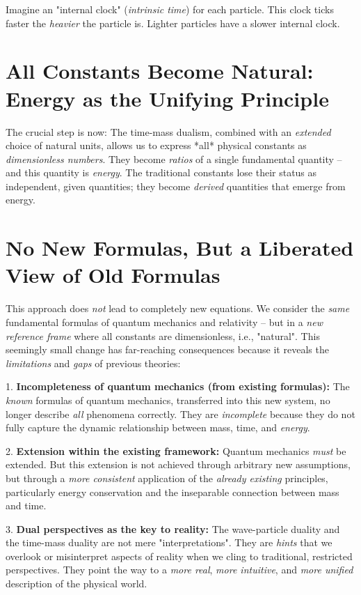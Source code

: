 \documentclass[a4paper,12pt]{article}
\begin{document}
	Imagine an "internal clock" (\emph{intrinsic time}) for each particle. This clock ticks faster the \emph{heavier} the particle is. Lighter particles have a slower internal clock.
	
	\section{All Constants Become Natural: Energy as the Unifying Principle}
	
	The crucial step is now: The time-mass dualism, combined with an \emph{extended} choice of natural units, allows us to express *all* physical constants as \emph{dimensionless numbers}. They become \emph{ratios} of a single fundamental quantity – and this quantity is \emph{energy}. The traditional constants lose their status as independent, given quantities; they become \emph{derived} quantities that emerge from energy.
	
	\section{No New Formulas, But a Liberated View of Old Formulas}
	
	This approach does \emph{not} lead to completely new equations. We consider the \emph{same} fundamental formulas of quantum mechanics and relativity – but in a \emph{new reference frame} where all constants are dimensionless, i.e., "natural". This seemingly small change has far-reaching consequences because it reveals the \emph{limitations} and \emph{gaps} of previous theories:
	
	1.  \textbf{Incompleteness of quantum mechanics (from existing formulas):} The \emph{known} formulas of quantum mechanics, transferred into this new system, no longer describe \emph{all} phenomena correctly. They are \emph{incomplete} because they do not fully capture the dynamic relationship between mass, time, and \emph{energy}.
	
	2.  \textbf{Extension within the existing framework:} Quantum mechanics \emph{must} be extended. But this extension is not achieved through arbitrary new assumptions, but through a \emph{more consistent} application of the \emph{already existing} principles, particularly energy conservation and the inseparable connection between mass and time.
	
	3.  \textbf{Dual perspectives as the key to reality:} The wave-particle duality and the time-mass duality are not mere "interpretations". They are \emph{hints} that we overlook or misinterpret aspects of reality when we cling to traditional, restricted perspectives. They point the way to a \emph{more real}, \emph{more intuitive}, and \emph{more unified} description of the physical world.
	
\end{document}
